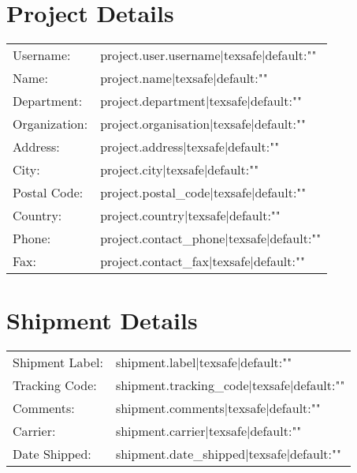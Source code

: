 \documentclass[6pt]{report}
\begin{document}
	\section*{Project Details}
	
	\begin{tabular}{ll}
		Username: & {{ project.user.username|texsafe|default:"" }} \\
		Name: & {{ project.name|texsafe|default:"" }} \\
		Department: & {{ project.department|texsafe|default:"" }} \\
		Organization: & {{ project.organisation|texsafe|default:"" }} \\
		Address: & {{ project.address|texsafe|default:"" }} \\
		City: & {{ project.city|texsafe|default:"" }} \\
		Postal Code: & {{ project.postal_code|texsafe|default:"" }} \\
		Country: & {{ project.country|texsafe|default:"" }} \\
		Phone: & {{ project.contact_phone|texsafe|default:"" }} \\
		Fax: & {{ project.contact_fax|texsafe|default:"" }} \\
	\end{tabular}

	\section*{Shipment Details}

	\begin{tabular}{ll}
		Shipment Label: & {{ shipment.label|texsafe|default:"" }} \\
		Tracking Code: & {{ shipment.tracking_code|texsafe|default:"" }} \\
		Comments: & {{ shipment.comments|texsafe|default:"" }} \\
		Carrier: & {{ shipment.carrier|texsafe|default:"" }} \\
		Date Shipped: & {{ shipment.date_shipped|texsafe|default:"" }} \\
	\end{tabular}
	
\end{document}
